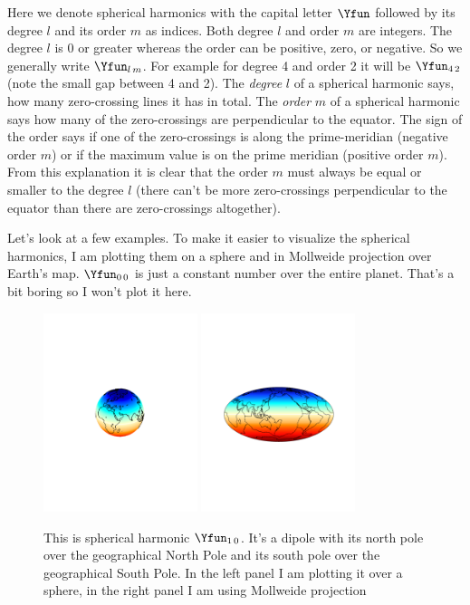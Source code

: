 \documentclass[11pt]{article}
\begin{document}
Here we denote spherical harmonics with the capital letter $\Yfun$ followed by its degree $l$ and its order $m$ as indices. Both degree $l$ and order $m$ are integers. The degree $l$ is 0 or greater whereas the order can be positive, zero, or negative. So we generally write $\Yfun_{l\,m}$. For example for degree 4 and order 2 it will be $\Yfun_{4\,2}$ (note the small gap between 4 and 2). The \emph{degree} $l$ of a spherical harmonic says, how many zero-crossing lines it has in total. The \emph{order} $m$ of a spherical harmonic says how many of the zero-crossings are perpendicular to the equator. The sign of the order says if one of the zero-crossings is along the prime-meridian (negative order $m$) or if the maximum value is on the prime meridian (positive order $m$). From this explanation it is clear that the order $m$ must always be equal or smaller to the degree $l$ (there can't be more zero-crossings perpendicular to the equator than there are zero-crossings altogether).

 Let's look at a few examples. To make it easier to visualize the spherical harmonics, I am plotting them on a sphere and in Mollweide projection over Earth's map. $\Yfun_{0\,0}$ is just a constant number over the entire planet. That's a bit boring so I won't plot it here.

\begin{figure}[H]
\centering
\includegraphics[width=0.4\textwidth,trim = 7cm 10cm 7cm 10cm, clip]{figures/Y10}
\includegraphics[width=0.4\textwidth,trim = 3cm 9cm 3cm 10cm, clip]{figures/Y10_Mol}
\caption{This is spherical harmonic $\Yfun_{1\,0}$. It's a dipole with its north pole over the geographical North Pole and its south pole over the geographical South Pole. In the left panel I am plotting it over a sphere, in the right panel I am using Mollweide projection}
\label{Y10fig}
\end{figure}
\end{document}

